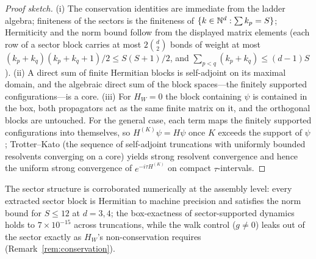 \begin{proof}[Proof sketch]
(i) The conservation identities are immediate from the ladder algebra; finiteness of the
sectors is the finiteness of $\{k\in\mathbb{N}^{d}:\sum k_{p}=S\}$; Hermiticity and the norm bound
follow from the displayed matrix elements (each row of a sector block carries at most
$2\binom{d}{2}$ bonds of weight at most $(k_{p}+k_{q})(k_{p}+k_{q}+1)/2\leq S(S+1)/2$, and
$\sum_{p<q}(k_{p}+k_{q})\leq(d-1)S$). (ii) A direct sum of finite Hermitian blocks is
self-adjoint on its maximal domain, and the algebraic direct sum of the block spaces---the
finitely supported configurations---is a core. (iii) For $H_{W}=0$ the block containing
$\psi$ is contained in the box, both propagators act as the same finite matrix on it, and
the orthogonal blocks are untouched. For the general case, each term maps the finitely
supported configurations into themselves, so $H^{(K)}\psi=H\psi$ once $K$ exceeds the
support of $\psi$; Trotter--Kato (the sequence of self-adjoint truncations with uniformly
bounded resolvents converging on a core) yields strong resolvent convergence and hence the
uniform strong convergence of $e^{-i\tau H^{(K)}}$ on compact $\tau$-intervals.
\end{proof}

The sector structure is corroborated numerically at the assembly level: every extracted
sector block is Hermitian to machine precision and satisfies the norm bound for $S\leq12$
at $d=3,4$; the box-exactness of sector-supported dynamics holds to $7\times10^{-15}$
across truncations, while the walk control ($g\neq0$) leaks out of the sector exactly as
$H_{W}$'s non-conservation requires (Remark~\ref{rem:conservation}).

